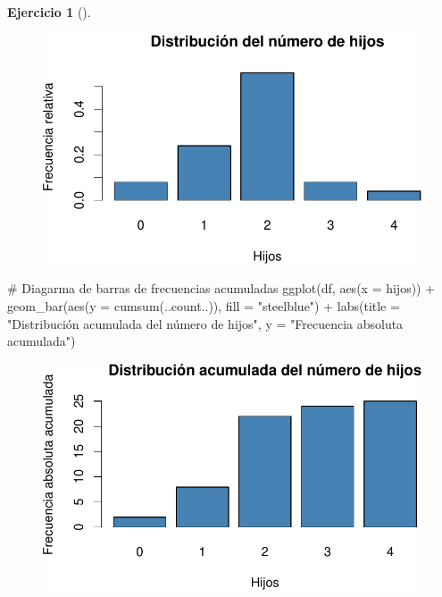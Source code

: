 \documentclass[
  a4paper,
]{scrreport}
\newenvironment{Shaded}{\begin{snugshade}}{\end{snugshade}}
\newcommand{\AttributeTok}[1]{\textcolor[rgb]{0.40,0.45,0.13}{#1}}
\newcommand{\CommentTok}[1]{\textcolor[rgb]{0.37,0.37,0.37}{#1}}
\newcommand{\FunctionTok}[1]{\textcolor[rgb]{0.28,0.35,0.67}{#1}}
\newcommand{\NormalTok}[1]{\textcolor[rgb]{0.00,0.23,0.31}{#1}}
\newcommand{\SpecialCharTok}[1]{\textcolor[rgb]{0.37,0.37,0.37}{#1}}
\newcommand{\StringTok}[1]{\textcolor[rgb]{0.13,0.47,0.30}{#1}}
\theoremstyle{definition}
\newtheorem{exercise}{Ejercicio}[chapter]
\theoremstyle{remark}
\begin{document}
\begin{exercise}[]
\begin{tcolorbox}
\begin{figure}[H]

{\centering \includegraphics{./03-frecuencias-graficos_files/figure-pdf/unnamed-chunk-6-2.pdf}

}

\end{figure}

\begin{Shaded}
\begin{Highlighting}[]
\CommentTok{\# Diagarma de barras de frecuencias acumuladas}
\FunctionTok{ggplot}\NormalTok{(df, }\FunctionTok{aes}\NormalTok{(}\AttributeTok{x =}\NormalTok{ hijos)) }\SpecialCharTok{+}
    \FunctionTok{geom\_bar}\NormalTok{(}\FunctionTok{aes}\NormalTok{(}\AttributeTok{y =} \FunctionTok{cumsum}\NormalTok{(..count..)), }\AttributeTok{fill =} \StringTok{"steelblue"}\NormalTok{) }\SpecialCharTok{+}
    \FunctionTok{labs}\NormalTok{(}\AttributeTok{title =} \StringTok{"Distribución acumulada del número de hijos"}\NormalTok{, }\AttributeTok{y =} \StringTok{"Frecuencia absoluta acumulada"}\NormalTok{)}
\end{Highlighting}
\end{Shaded}

\begin{figure}[H]

{\centering \includegraphics{./03-frecuencias-graficos_files/figure-pdf/unnamed-chunk-6-3.pdf}

}
\end{figure}
\end{tcolorbox}
\end{exercise}
\end{document}
